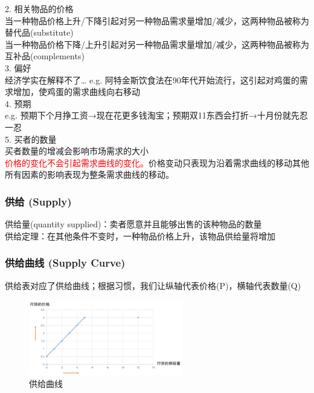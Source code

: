 \documentclass[12pt,a4paper]{article}
\begin{document}
2. 相关物品的价格\\
当一种物品价格上升/下降引起对另一种物品需求量增加/减少，这两种物品被称为替代品(substitute)\\
当一种物品价格下降/上升引起对另一种物品需求量增加/减少，这两种物品被称为互补品(complements)\\

3. 偏好\\
经济学实在解释不了… e.g. 阿特金斯饮食法在90年代开始流行，这引起对鸡蛋的需求增加，使鸡蛋的需求曲线向右移动\\

4. 预期\\
e.g. 预期下个月挣工资→现在花更多钱淘宝；预期双11东西会打折→十月份就先忍一忍\\

5. 买者的数量\\
买者数量的增减会影响市场需求的大小\\

\textcolor{red}{价格的变化不会引起需求曲线的变化。}价格变动只表现为沿着需求曲线的移动其他所有因素的影响表现为整条需求曲线的移动。\\


\subsubsection{供给 (Supply)}
供给量(quantity supplied)：卖者愿意并且能够出售的该种物品的数量\\

供给定理：在其他条件不变时，一种物品价格上升，该物品供给量将增加

\subsubsection{供给曲线 (Supply Curve)}
供给表对应了供给曲线；根据习惯，我们让纵轴代表价格(P)，横轴代表数量(Q)

\begin{figure}[H] 
  \centering %
  \includegraphics[width=0.6\textwidth]{供给曲线.png} %
  \caption{供给曲线} %
\end{figure}
\end{document}
